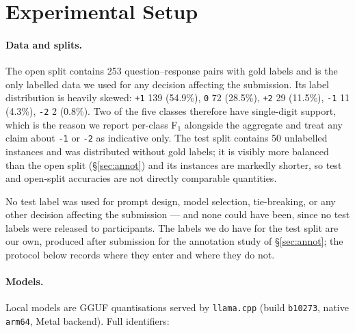 
\section{Experimental Setup}
\label{sec:setup}

\paragraph{Data and splits.}
The open split contains 253 question--response pairs with gold labels
and is the only labelled data we used for any decision affecting the
submission. Its label distribution is heavily skewed:
\texttt{+1} 139 (54.9\%), \texttt{0} 72 (28.5\%), \texttt{+2} 29
(11.5\%), \texttt{-1} 11 (4.3\%), \texttt{-2} 2 (0.8\%). Two of the
five classes therefore have single-digit support, which is the reason
we report per-class F$_1$ alongside the aggregate and treat any
claim about \texttt{-1} or \texttt{-2} as indicative only. The test
split contains 50 unlabelled instances and was distributed without gold
labels; it is visibly more balanced than the open split
(\S\ref{sec:annot}) and its instances are markedly shorter, so test and
open-split accuracies are not directly comparable quantities.

No test label was used for prompt design, model selection, tie-breaking,
or any other decision affecting the submission --- and none could have
been, since no test labels were released to participants. The labels we
do have for the test split are our own, produced after submission for
the annotation study of \S\ref{sec:annot}; the protocol below records
where they enter and where they do not.

\paragraph{Models.}
Local models are GGUF quantisations served by \texttt{llama.cpp}
(build \texttt{b10273}, native \texttt{arm64}, Metal backend). Full
identifiers:

